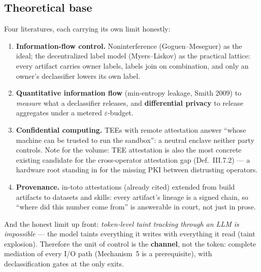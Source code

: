 \documentclass[11pt,a4paper]{article}
\theoremstyle{definition}
\theoremstyle{remark}
\begin{document}
\subsection{Theoretical base}
Four literatures, each carrying its own limit honestly:
\begin{enumerate}[leftmargin=1.4em,itemsep=1pt]
\item \textbf{Information-flow control.} Noninterference (Goguen--Meseguer) as the ideal; the decentralized label model (Myers--Liskov) as the practical lattice: every artifact carries owner labels, labels join on combination, and only an owner's declassifier lowers its own label.
\item \textbf{Quantitative information flow} (min-entropy leakage, Smith 2009) to \emph{measure} what a declassifier releases, and \textbf{differential privacy} to release aggregates under a metered $\varepsilon$-budget.
\item \textbf{Confidential computing.} TEEs with remote attestation answer ``whose machine can be trusted to run the sandbox'': a neutral enclave neither party controls. Note for the volume: TEE attestation is also the most concrete existing candidate for the cross-operator attestation gap (Def.~III.7.2) --- a hardware root standing in for the missing PKI between distrusting operators.
\item \textbf{Provenance.} in-toto attestations (already cited) extended from build artifacts to datasets and skills: every artifact's lineage is a signed chain, so ``where did this number come from'' is answerable in court, not just in prose.
\end{enumerate}
And the honest limit up front: \emph{token-level taint tracking through an LLM is impossible} --- the model taints everything it writes with everything it read (taint explosion). Therefore the unit of control is the \textbf{channel}, not the token: complete mediation of every I/O path (Mechanism~5 is a prerequisite), with declassification gates at the only exits.
\end{document}
